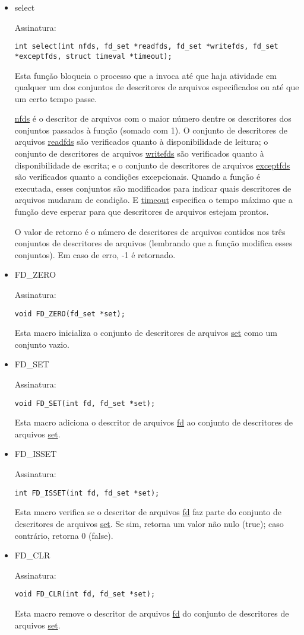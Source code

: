 \documentclass[a4paper,10pt]{article}
\begin{document}
\begin{itemize}
\item select

Assinatura:
\begin{lstlisting}
int select(int nfds, fd_set *readfds, fd_set *writefds, fd_set *exceptfds, struct timeval *timeout);
\end{lstlisting}
Esta função bloqueia o processo que a invoca até que haja atividade em qualquer um dos conjuntos de descritores de arquivos especificados ou até que um certo tempo passe.

\underline{nfds} é o descritor de arquivos com o maior número dentre os descritores dos conjuntos passados à função (somado com 1). O conjunto de descritores de arquivos \underline{readfds} são verificados quanto à disponibilidade de leitura; o conjunto de descritores de arquivos \underline{writefds} são verificados quanto à disponibilidade de escrita; e o conjunto de descritores de arquivos \underline{exceptfds} são verificados quanto a condições excepcionais. Quando a função é executada, esses conjuntos são modificados para indicar quais descritores de arquivos mudaram de condição. E \underline{timeout} especifica o tempo máximo que a função deve esperar para que descritores de arquivos estejam prontos.

O valor de retorno é o número de descritores de arquivos contidos nos três conjuntos de descritores de arquivos (lembrando que a função modifica esses conjuntos). Em caso de erro, -1 é retornado.

\item FD\_ZERO

Assinatura:
\begin{lstlisting}
void FD_ZERO(fd_set *set);
\end{lstlisting}
Esta macro inicializa o conjunto de descritores de arquivos \underline{set} como um conjunto vazio.

\item FD\_SET

Assinatura:
\begin{lstlisting}
void FD_SET(int fd, fd_set *set);
\end{lstlisting}
Esta macro adiciona o descritor de arquivos \underline{fd} ao conjunto de descritores de arquivos \underline{set}.

\item FD\_ISSET

Assinatura:
\begin{lstlisting}
int FD_ISSET(int fd, fd_set *set);
\end{lstlisting}
Esta macro verifica se o descritor de arquivos \underline{fd} faz parte do conjunto de descritores de arquivos \underline{set}. Se sim, retorna um valor não nulo (true); caso contrário, retorna 0 (false).

\item FD\_CLR

Assinatura:
\begin{lstlisting}
void FD_CLR(int fd, fd_set *set);
\end{lstlisting}
Esta macro remove o descritor de arquivos \underline{fd} do conjunto de descritores de arquivos \underline{set}.
\end{itemize}
\end{document}
